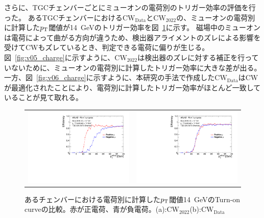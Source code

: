 さらに、TGCチェンバーごとにミューオンの電荷別のトリガー効率の評価を行った。
あるTGCチェンバーにおける$\mathrm{CW_{Data}}$と$\mathrm{CW_{2022}}$の、ミューオンの電荷別に計算した$p_{\rm{T}}$閾値が14~GeVのトリガー効率を図~\ref{Eff_Chage}に示す。
磁場中のミューオンは電荷によって曲がる方向が違うため、検出器アライメントのズレによる影響を受けてCWもズレているとき、判定できる電荷に偏りが生じる。図~\ref{fig:v05_charge}に示すように、$\mathrm{CW_{2022}}$は検出器のズレに対する補正を行っていないために、ミューオンの電荷別に計算したトリガー効率に大きな差が出る。
一方、図~\ref{fig:v06_charge}に示すように、本研究の手法で作成した$\mathrm{CW_{Data}}$はCWが最適化されたことにより、電荷別に計算したトリガー効率がほとんど一致していることが見て取れる。
\begin{figure}[htbp]
    \begin{tabular}{cc}
    \begin{minipage}[b]{0.45\hsize}
        \includegraphics[clip, width=7cm]{fig/5/Eff_PNcharge_v05_phi0eta10_re.pdf}
        \subcaption{}
        \label{fig:v05_charge}
    \end{minipage}&
    \begin{minipage}[b]{0.45\hsize}
        \includegraphics[clip, width=7cm]{fig/5/Eff_PNcharge_MLP_phi0eta10_re.pdf}
        \subcaption{}
        \label{fig:v06_charge}
    \end{minipage}
    \end{tabular}
    \caption{あるチェンバーにおける電荷別に計算した$p_{\rm{T}}$閾値14~GeVのTurn-on curveの比較。赤が正電荷、青が負電荷。(a):$\mathrm{CW_{2022}}$(b):$\mathrm{CW_{Data}}$}
    \label{Eff_Chage}
\end{figure}

